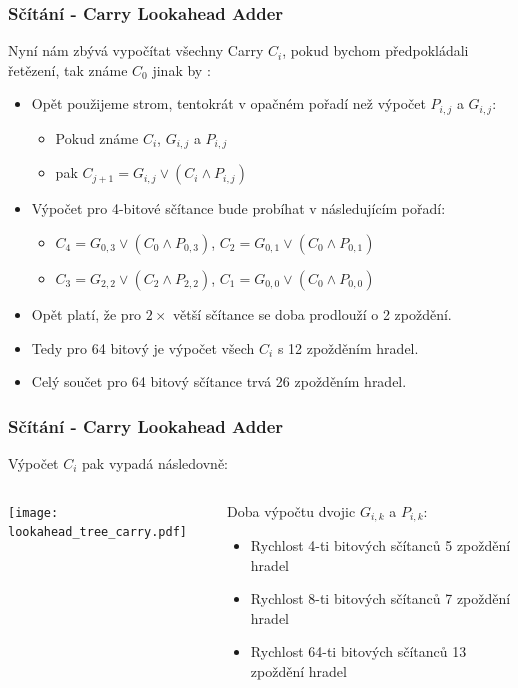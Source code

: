 \documentclass{beamer}
\begin{document}
\begin{frame}
\frametitle{Sčítání - Carry Lookahead Adder}

Nyní nám zbývá vypočítat všechny Carry $C_i$, pokud bychom předpokládali řetězení, tak známe $C_0$ jinak by :
\begin{itemize}
\item Opět použijeme strom, tentokrát v opačném pořadí než výpočet $P_{i,j}$ a $G_{i,j}$:
\begin{itemize}
\item Pokud známe $C_i$, $G_{i,j}$ a $P_{i,j}$
\item pak $C_{j+1} = G_{i,j} \lor (C_i \land P_{i,j})$ 
\end{itemize}
\item Výpočet pro 4-bitové sčítance bude probíhat v následujícím pořadí:
\begin{itemize}
\item $C_4 = G_{0,3} \lor (C_0 \land P_{0,3})$, $C_2 = G_{0,1} \lor (C_0 \land P_{0,1})$
\item $C_3 = G_{2,2} \lor (C_2 \land P_{2,2})$, $C_1 = G_{0,0} \lor (C_0 \land P_{0,0})$
\end{itemize}
\item Opět platí, že pro $2\times$ větší sčítance se doba prodlouží o 2 zpoždění. 
\item Tedy pro 64 bitový je výpočet všech $C_i$ s 12 zpožděním hradel.
\item Celý součet pro 64 bitový sčítance trvá 26 zpožděním hradel.
\end{itemize}

\end{frame}


\begin{frame}
\frametitle{Sčítání - Carry Lookahead Adder}

Výpočet $C_i$ pak vypadá následovně:
\begin{columns}
\begin{column}{0.5\textwidth}
\begin{center}
   \texttt{[image: lookahead\_tree\_carry.pdf]}
\end{center}
\end{column}
\begin{column}{0.5\textwidth}

Doba výpočtu dvojic $G_{i,k}$ a $P_{i,k}$:
\begin{itemize}
\item Rychlost 4-ti bitových sčítanců 5 zpoždění hradel
\item Rychlost 8-ti bitových sčítanců 7 zpoždění hradel
\item Rychlost 64-ti bitových sčítanců 13 zpoždění hradel
\end{itemize}

\end{column}
\end{columns}

\end{frame}
\end{document}
